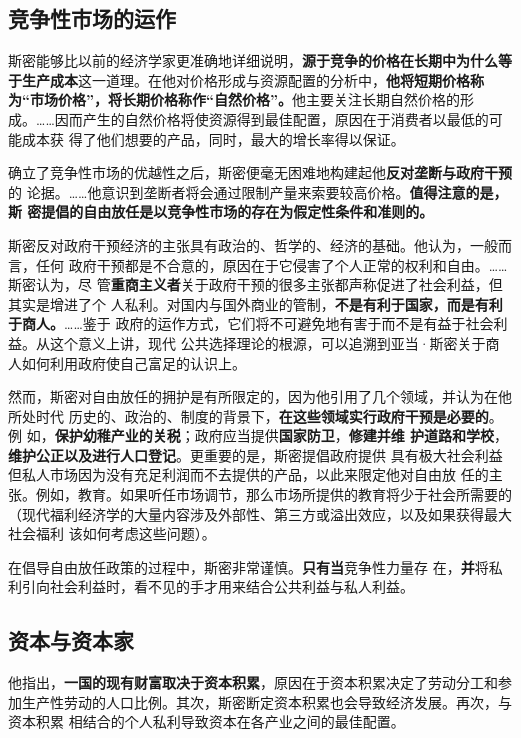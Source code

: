 \subsection{竞争性市场的运作}

斯密能够比以前的经济学家更准确地详细说明，\textbf{源于竞争的价格在长期中为什么等
  于生产成本}这一道理。在他对价格形成与资源配置的分析中，\textbf{他将短期价格称
  为“市场价格”，将长期价格称作“自然价格”。}他主要关注长期自然价格的形
成。……因而产生的自然价格将使资源得到最佳配置，原因在于消费者以最低的可能成本获
得了他们想要的产品，同时，最大的增长率得以保证。

确立了竞争性市场的优越性之后，斯密便毫无困难地构建起他\textbf{反对垄断与政府干预}的
论据。……他意识到垄断者将会通过限制产量来索要较高价格。\textbf{值得注意的是，斯
  密提倡的自由放任是以竞争性市场的存在为假定性条件和准则的。}

斯密反对政府干预经济的主张具有政治的、哲学的、经济的基础。他认为，一般而言，任何
政府干预都是不合意的，原因在于它侵害了个人正常的权利和自由。……斯密认为，尽
管\textbf{重商主义者}关于政府干预的很多主张都声称促进了社会利益，但其实是增进了个
人私利。对国内与国外商业的管制，\textbf{不是有利于国家，而是有利于商人。}……鉴于
政府的运作方式，它们将不可避免地有害于而不是有益于社会利益。从这个意义上讲，现代
公共选择理论的根源，可以追溯到亚当·斯密关于商人如何利用政府使自己富足的认识上。

然而，斯密对自由放任的拥护是有所限定的，因为他引用了几个领域，并认为在他所处时代
历史的、政治的、制度的背景下，\textbf{在这些领域实行政府干预是必要的}。例
如，\textbf{保护幼稚产业的关税}；政府应当提供\textbf{国家防卫}，\textbf{修建并维
  护道路和学校}，\textbf{维护公正以及进行人口登记}。更重要的是，斯密提倡政府提供
具有极大社会利益但私人市场因为没有充足利润而不去提供的产品，以此来限定他对自由放
任的主张。例如，教育。如果听任市场调节，那么市场所提供的教育将少于社会所需要的
（现代福利经济学的大量内容涉及外部性、第三方或溢出效应，以及如果获得最大社会福利
该如何考虑这些问题）。

在倡导自由放任政策的过程中，斯密非常谨慎。\textbf{只有当}竞争性力量存
在，\textbf{并}将私利引向社会利益时，看不见的手才用来结合公共利益与私人利益。

\subsection{资本与资本家}

他指出，\textbf{一国的现有财富取决于资本积累}，原因在于资本积累决定了劳动分工和参
加生产性劳动的人口比例。其次，斯密断定资本积累也会导致经济发展。再次，与资本积累
相结合的个人私利导致资本在各产业之间的最佳配置。

